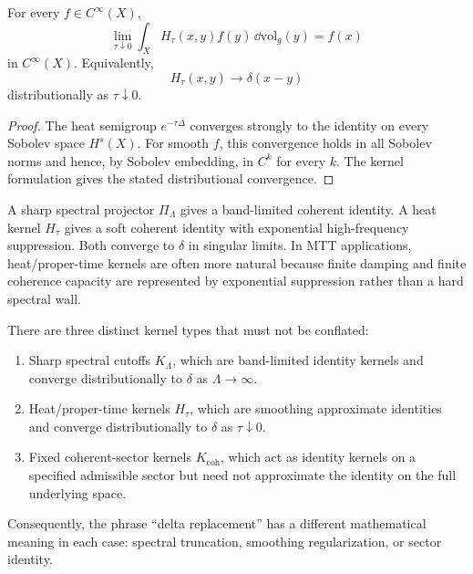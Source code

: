 \documentclass[11pt]{article}
\begin{document}
\begin{theorem}\label{thm:heat}
For every \(f\in C^\infty(X)\),
\begin{equation}
\lim_{\tau\downarrow 0}\int_X H_\tau(x,y)f(y)\,\dd\mathrm{vol}_g(y)=f(x)
\end{equation}
in \(C^\infty(X)\).  Equivalently,
\begin{equation}
H_\tau(x,y)\to \delta(x-y)
\end{equation}
distributionally as \(\tau\downarrow 0\).
\end{theorem}

\begin{proof}
The heat semigroup \(e^{-\tau\Delta}\) converges strongly to the identity on every Sobolev
space \(H^s(X)\).  For smooth \(f\), this convergence holds in all Sobolev norms and hence,
by Sobolev embedding, in \(C^k\) for every \(k\).  The kernel formulation gives the stated
distributional convergence.
\end{proof}

\begin{remark}
A sharp spectral projector \(\Pi_\Lambda\) gives a band-limited coherent identity.  A heat
kernel \(H_\tau\) gives a soft coherent identity with exponential high-frequency suppression.
Both converge to \(\delta\) in singular limits.  In MTT applications, heat/proper-time kernels
are often more natural because finite damping and finite coherence capacity are represented
by exponential suppression rather than a hard spectral wall.
\end{remark}


\begin{proposition}\label{prop:three-kernels}
There are three distinct kernel types that must not be conflated:
\begin{enumerate}
\item Sharp spectral cutoffs \(K_\Lambda\), which are band-limited identity kernels and
converge distributionally to \(\delta\) as \(\Lambda\to\infty\).
\item Heat/proper-time kernels \(H_\tau\), which are smoothing approximate identities and
converge distributionally to \(\delta\) as \(\tau\downarrow 0\).
\item Fixed coherent-sector kernels \(K_{\mathrm{coh}}\), which act as identity kernels on a
specified admissible sector but need not approximate the identity on the full underlying
space.
\end{enumerate}
Consequently, the phrase ``delta replacement'' has a different mathematical meaning in
each case: spectral truncation, smoothing regularization, or sector identity.
\end{proposition}
\end{document}
